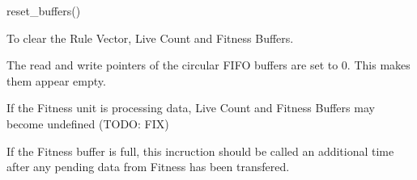 

\format
reset\_buffers()

\purpose

To clear the Rule Vector, Live Count and Fitness Buffers.

\description

The read and write pointers of the circular FIFO buffers are set to 0.
This makes them appear empty.

\notes

If the Fitness unit is processing data, Live Count and Fitness Buffers may become undefined (TODO: FIX)

If the Fitness buffer is full, this incruction should be called an additional time after any pending data from Fitness has been transfered.
